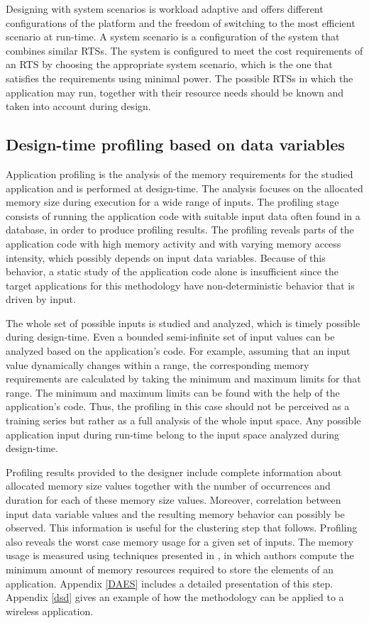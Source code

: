 Designing with system scenarios is workload adaptive and offers different configurations of the platform and the freedom of switching to the most efficient scenario at run-time. 
A system scenario is a configuration of the system that combines similar RTSs.
The system is configured to meet the cost requirements of an RTS by choosing the appropriate system scenario, which is the one that satisfies the requirements using minimal power.
The possible RTSs  in which the application may run, together with their resource needs should be known and taken into account during design.  



\subsection{Design-time profiling based on data variables}

Application profiling is the analysis of the memory requirements for the studied application and is performed at design-time.
The analysis focuses on the allocated memory size during execution  for a wide range of inputs. 
The profiling stage consists of running the application code with suitable input data often found in a database, in order to produce profiling results.  
The profiling reveals parts of the application code with high memory activity and with varying memory access intensity, which possibly depends on input data variables. 
Because of this behavior, a static study of the application code alone is insufficient since the target applications for this methodology have non-deterministic behavior that is driven by input.

The whole set of possible inputs is studied and analyzed, which is timely possible during design-time.
Even a bounded semi-infinite set of input values can be analyzed based on the application's code.
For example, assuming that an input value dynamically changes within a range, the corresponding memory requirements are calculated by taking the minimum and maximum limits for that range.
The minimum and maximum limits can be found with the help of the application's code.
Thus, the profiling in this case should not be perceived as a training series but rather as a full analysis of the whole input space.
Any possible application input during run-time belong to the input space analyzed during design-time.

Profiling results provided to the designer include complete information about allocated memory size values together with the number of occurrences and duration for each of these memory size values. 
Moreover, correlation between input data variable values and the resulting memory behavior can possibly be observed. 
This information is useful for the clustering step that follows. 
Profiling also reveals the worst case memory usage for a given set of inputs. 
The memory usage is measured using techniques presented in \cite{Ang13b}, in which authors compute the minimum amount of memory resources required to store the elements of an application. 
Appendix \ref{DAES} includes a detailed presentation of this step. Appendix \ref{dsd} gives an example of how the methodology can be applied to a wireless application.

